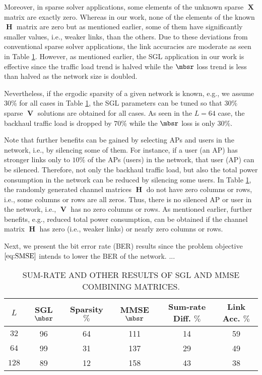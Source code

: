 \documentclass[journal]{IEEEtran}
\begin{document}
Moreover, in sparse solver applications, some elements of the unknown sparse $\mbfX$ matrix are exactly zero. Whereas in our work, none of the elements of the known $\mbfH$ matrix are zero but as mentioned earlier, some of them have significantly smaller values, i.e., weaker links, than the others. Due to these deviations from conventional sparse solver applications, the link accuracies are moderate as seen in Table \ref{tab:Compare}. However, as mentioned earlier, the SGL application in our work is effective since the traffic load trend is halved while the $\mbsr$ loss trend is less than halved as the network size is doubled. 

Nevertheless, if the ergodic sparsity of a given network is known, e.g., we assume $30\%$ for all cases in Table \ref{tab:Compare}, the SGL parameters can be tuned so that $30\%$ sparse $\mbfV$ solutions are obtained for all cases. As seen in the $L=64$ case, the backhaul traffic load is dropped by $70\%$ while the $\mbsr$ loss is only $30\%$.

Note that further benefits can be gained by selecting APs and users in the network, i.e., by silencing some of them. For instance, if a user (an AP) has stronger links only to $10\%$ of the APs (users) in the network, that user (AP) can be silenced. Therefore, not only the backhaul traffic load, but also the total power consumption in the network can be reduced by silencing some users. In Table \ref{tab:Compare}, the randomly generated channel matrices $\mbfH$ do not have zero columns or rows, i.e., some columns or rows are all zeros. Thus, there is no silenced AP or user in the network, i.e., $\mbfV$ has no zero columns or rows. As mentioned earlier, further benefits, e.g., reduced total power consumption, can be obtained if the channel matrix $\mbfH$ has zero (i.e., weaker links) or nearly zero columns or rows.

Next, we present the bit error rate (BER) results since the problem objective $\eqref{eq:SMSE}$ intends to lower the BER of the network. ...

\begin{table}[!t]
\scriptsize 
\begin{center}
\caption{SUM-RATE AND OTHER RESULTS OF SGL AND MMSE COMBINING MATRICES.} \label{tab:Compare}\vspace{-.2cm}
\begin{tabular}{|c|c|c|c|c|c|}\hline
$L$ & SGL $\mbsr$& Sparsity $\%$ & MMSE $\mbsr$ & Sum-rate Diff. $\%$ & Link Acc. $\%$ \\\hline
$32$ & 96 & 64 & 111 & 14 & 59 \\\hline
$64$ & 99 & 31 & 137 & 29 & 49 \\\hline
$128$ & 89 & 12 & 158 & 43 & 38 \\\hline
\end{tabular}
\end{center}
\vspace{-.5cm}
\end{table}




\end{document}
